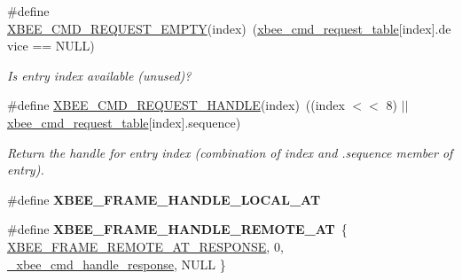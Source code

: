 \begin{DoxyCompactItemize}
\item 
\hypertarget{group__xbee__atcmd_ga56c0812894871f4a6429ef00ac2d15c7}{\#define \hyperlink{group__xbee__atcmd_ga56c0812894871f4a6429ef00ac2d15c7}{X\-B\-E\-E\-\_\-\-C\-M\-D\-\_\-\-R\-E\-Q\-U\-E\-S\-T\-\_\-\-E\-M\-P\-T\-Y}(index)~(\hyperlink{group__xbee__atcmd_ga551531248de3d539dfb15bd89cf4734b}{xbee\-\_\-cmd\-\_\-request\-\_\-table}\mbox{[}index\mbox{]}.device == N\-U\-L\-L)}\label{group__xbee__atcmd_ga56c0812894871f4a6429ef00ac2d15c7}

\begin{DoxyCompactList}\small\item\em Is entry {\itshape index} available (unused)? \end{DoxyCompactList}\item 
\#define \hyperlink{group__xbee__atcmd_gac86e9f2dc459c0c6b758ba90142bbc54}{X\-B\-E\-E\-\_\-\-C\-M\-D\-\_\-\-R\-E\-Q\-U\-E\-S\-T\-\_\-\-H\-A\-N\-D\-L\-E}(index)~((index $<$$<$ 8) $|$$|$ \hyperlink{group__xbee__atcmd_ga551531248de3d539dfb15bd89cf4734b}{xbee\-\_\-cmd\-\_\-request\-\_\-table}\mbox{[}index\mbox{]}.sequence)
\begin{DoxyCompactList}\small\item\em Return the handle for entry {\itshape index} (combination of {\itshape index} and {\itshape }.sequence member of entry). \end{DoxyCompactList}\item 
\#define {\bfseries X\-B\-E\-E\-\_\-\-F\-R\-A\-M\-E\-\_\-\-H\-A\-N\-D\-L\-E\-\_\-\-L\-O\-C\-A\-L\-\_\-\-A\-T}
\item 
\hypertarget{group__xbee__atcmd_gab361800e13206736264e7d1e5ebd159a}{\#define {\bfseries X\-B\-E\-E\-\_\-\-F\-R\-A\-M\-E\-\_\-\-H\-A\-N\-D\-L\-E\-\_\-\-R\-E\-M\-O\-T\-E\-\_\-\-A\-T}~\{ \hyperlink{group__xbee__device_gga7753bbebaf00d6d64942f64b6ae9b7b9a3cd726459592fab4cdc9b5e6bbecb79f}{X\-B\-E\-E\-\_\-\-F\-R\-A\-M\-E\-\_\-\-R\-E\-M\-O\-T\-E\-\_\-\-A\-T\-\_\-\-R\-E\-S\-P\-O\-N\-S\-E}, 0, \hyperlink{group__xbee__atcmd_ga3b4559f4e729b1c96f5c0d9e4476aa7d}{\-\_\-xbee\-\_\-cmd\-\_\-handle\-\_\-response}, N\-U\-L\-L \}}\label{group__xbee__atcmd_gab361800e13206736264e7d1e5ebd159a}

\end{DoxyCompactItemize}
